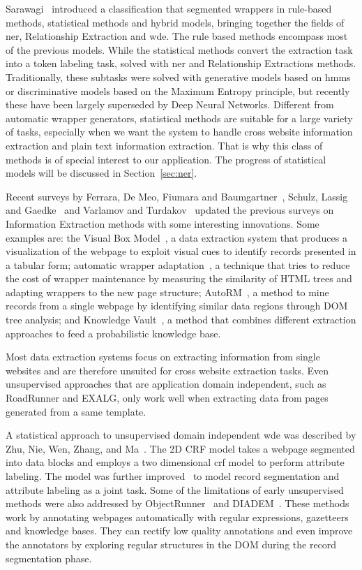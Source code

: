 \documentclass{nle}
\begin{document}
Sarawagi~ introduced a classification that segmented wrappers in
rule-based methods, statistical methods and hybrid models, bringing together 
the fields of \gls{ner}, Relationship Extraction and \gls{wde}. 
The rule based methods encompass most of the previous models. While the statistical methods 
convert the extraction task into a token labeling task, solved with \gls{ner} 
and Relationship Extractions methods. Traditionally, these subtasks were solved with 
generative models based on \gls{hmm}s or discriminative models based on the 
Maximum Entropy principle, but recently these have been largely superseded by Deep Neural 
Networks. Different from automatic wrapper generators, statistical methods are suitable for
a large variety of tasks, especially when we want the system to handle cross website information 
extraction and plain text information extraction. That is why this class of methods is of 
special interest to our application. The progress of statistical models will be 
discussed in Section~\ref{sec:ner}.

Recent surveys by Ferrara, De Meo, Fiumara and Baumgartner~, 
Schulz, Lassig and Gaedke~ and
Varlamov and Turdakov~
updated the previous surveys on Information Extraction methods with some interesting innovations. 
Some examples are: the Visual Box Model~\cite{Krupl2005}, a data extraction system that produces 
a visualization of the webpage to exploit visual cues to identify records presented in a tabular form;
automatic wrapper adaptation~\cite{Ferrara2011}, a technique that tries to reduce the cost of 
wrapper maintenance by measuring the similarity of HTML trees and adapting
wrappers to the new page structure; AutoRM~\cite{Shi2015}, a method to mine
records from a single webpage by identifying similar data regions through DOM
tree analysis; and Knowledge Vault~\cite{Dong2014}, a method that combines different 
extraction approaches to feed a probabilistic knowledge base.

Most data extraction systems focus on extracting information from single websites
and are therefore unsuited for cross website extraction tasks. Even unsupervised
approaches that are application domain independent, such as RoadRunner and EXALG, 
only work well when extracting data from pages generated from a same template. 

A statistical approach to unsupervised domain 
independent \gls{wde} was described by Zhu, Nie, Wen, Zhang, and Ma~. The 2D CRF 
model takes a webpage segmented into data blocks and employs a two dimensional \gls{crf}
model to perform attribute labeling. The model was further improved~\cite{Zhu2006} to model 
record segmentation and attribute labeling as a joint task.
Some of the limitations of early unsupervised methods 
were also addressed by ObjectRunner~\cite{Abdessalem2010} and DIADEM~\cite{Furche2012}. 
These methods work by annotating webpages automatically with regular expressions, gazetteers and 
knowledge bases. They can rectify low quality annotations and even improve the annotators
by exploring regular structures in the DOM during the record segmentation phase.
\end{document}
